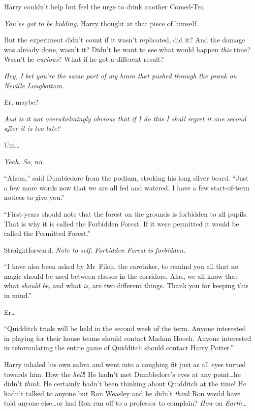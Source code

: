 Harry couldn’t help but feel the urge to drink another Comed-Tea.

\emph{You’ve \emph{got} to be kidding,} Harry thought at that piece of himself.

But the experiment didn’t count if it wasn’t replicated, did it? And the damage was already done, wasn’t it? Didn’t he want to see what would happen \emph{this} time? Wasn’t he \emph{curious}? What if he got a different result?

\emph{Hey, I bet you’re the same part of my brain that pushed through the prank on Neville Longbottom.}

Er, maybe?

\emph{And is it not \emph{overwhelmingly} obvious that if I do this I shall regret it one second after it is too late?}

Um…

\emph{Yeah. So,} no\emph{.}

“Ahem,” said Dumbledore from the podium, stroking his long silver beard. “Just a few more words now that we are all fed and watered. I have a few start-of-term notices to give you.”

“First-years should note that the forest on the grounds is forbidden to all pupils. That is why it is called the Forbidden Forest. If it were permitted it would be called the Permitted Forest.”

Straightforward. \emph{Note to self: Forbidden Forest is forbidden.}

“I have also been asked by Mr~Filch, the caretaker, to remind you all that no magic should be used between classes in the corridors. Alas, we all know that what \emph{should be}, and what \emph{is}, are two different things. Thank you for keeping this in mind.”

Er…

“Quidditch trials will be held in the second week of the term. Anyone interested in playing for their house teams should contact Madam Hooch. Anyone interested in reformulating the entire game of Quidditch should contact Harry Potter.”

Harry inhaled his own saliva and went into a coughing fit just as all eyes turned towards him. How the \emph{hell}! He hadn’t met Dumbledore’s eyes at any point…he didn’t \emph{think}. He certainly hadn’t been thinking about Quidditch at the time! He hadn’t talked to anyone but Ron Weasley and he didn’t \emph{think} Ron would have told anyone else…or had Ron run off to a professor to complain? \emph{How} on \emph{Earth…}


